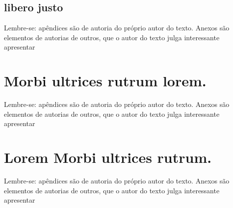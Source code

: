 \documentclass[
	12pt,				%
	openright,			%
	oneside,			%
	a4paper,			%
	english,			%
	brazil				%
	]{abntex2}
\begin{document}
\postextual

\printbibliography[title=Referências]


%
%

\begin{apendicesenv}


\chapter{libero justo}
Lembre-se: apêndices são de autoria do próprio autor do texto. Anexos são elementos de autorias de outros, que o autor do texto julga interessante apresentar


\end{apendicesenv}

\begin{anexosenv}


\chapter{Morbi ultrices rutrum lorem.}
Lembre-se: apêndices são de autoria do próprio autor do texto. Anexos são elementos de autorias de outros, que o autor do texto julga interessante apresentar

\chapter{Lorem Morbi ultrices rutrum.}
Lembre-se: apêndices são de autoria do próprio autor do texto. Anexos são elementos de autorias de outros, que o autor do texto julga interessante apresentar

\end{anexosenv}

\printindex
\end{document}
